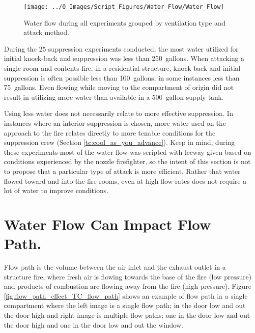 \documentclass[12pt,oneside]{book}
\begin{document}
\begin{figure}[H]
\centering
\texttt{[image: ../0\_Images/Script\_Figures/Water\_Flow/Water\_Flow]}
\caption[Water Flow All Experiments]{Water flow during all experiments grouped by ventilation type and attack method.}
\label{fig:water_amount_TC_all}
\end{figure}

During the 25 suppression experiments conducted, the most water utilized for initial knock-back and suppression was less than 250~gallons. When attacking a single room and contents fire, in a residential structure, knock back and initial suppression is often possible less than 100~gallons, in some instances less than 75~gallons. Even flowing while moving to the compartment of origin did not result in utilizing more water than available in a 500~gallon supply tank.  

Using less water does not necessarily relate to more effective suppression. In instances where an interior suppression is chosen, more water used on the approach to the fire relates directly to more tenable conditions for the suppression crew (Section \ref{tc:cool_as_you_advance}). Keep in mind, during these experiments most of the water flow was scripted with leeway given based on conditions experienced by the nozzle firefighter, so the intent of this section is not to propose that a particular type of attack is more efficient.  Rather that water flowed toward and into the fire rooms, even at high flow rates does not require a lot of water to improve conditions.

\section{Water Flow Can Impact Flow Path.} \label{tc:water_impact_flowpath}
Flow path is the volume between the air inlet and the exhaust outlet in a structure fire, where fresh air is flowing towards the base of the fire (low pressure) and products of combustion are flowing away from the fire (high pressure). Figure \ref{fig:flow_path_effect_TC_flow_path} shows an example of flow path in a single compartment where the left image is a single flow path; in the door low and out the door high and right image is multiple flow paths; one in the door low and out the door high and one in the door low and out the window. 
\end{document}
